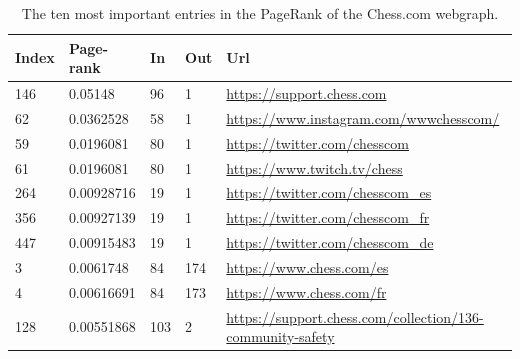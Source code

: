 \documentclass[unicode,11pt,a4paper,oneside,numbers=endperiod,openany]{scrartcl}
\begin{document}
\begin{table}[h!]
    \small
    \centering
    \begin{tabular}{|l|l|l|l|l|} 
        \hline
        \textbf{Index} & \textbf{Page-rank} & \textbf{In} & \textbf{Out} & \textbf{Url}\\
        \hline
        146 &    0.05148 &  96 &   1 & \tiny{\url{https://support.chess.com}} \\
         62 &  0.0362528 &  58 &   1 & \tiny{\url{https://www.instagram.com/wwwchesscom/}} \\
         59 &  0.0196081 &  80 &   1 & \tiny{\url{https://twitter.com/chesscom}} \\
         61 &  0.0196081 &  80 &   1 & \tiny{\url{https://www.twitch.tv/chess}} \\
        264 & 0.00928716 &  19 &   1 & \tiny{\url{https://twitter.com/chesscom_es}} \\
        356 & 0.00927139 &  19 &   1 & \tiny{\url{https://twitter.com/chesscom_fr}} \\
        447 & 0.00915483 &  19 &   1 & \tiny{\url{https://twitter.com/chesscom_de}} \\
          3 &  0.0061748 &  84 & 174 & \tiny{\url{https://www.chess.com/es}} \\
          4 & 0.00616691 &  84 & 173 & \tiny{\url{https://www.chess.com/fr}} \\
        128 & 0.00551868 & 103 &   2 & \tiny{\url{https://support.chess.com/collection/136-community-safety}} \\
        \hline
    \end{tabular}
    \caption{The ten most important entries in the PageRank of the Chess.com webgraph.}
    \label{table:chesscom}
\end{table}
\end{document}
